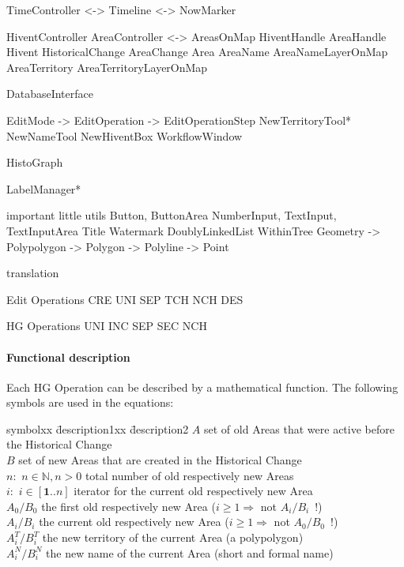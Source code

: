 TimeController  <-> Timeline
                <-> NowMarker

HiventController                AreaController <->  AreasOnMap
HiventHandle                    AreaHandle
Hivent
HistoricalChange    AreaChange  Area
                                AreaName            AreaNameLayerOnMap
                                AreaTerritory       AreaTerritoryLayerOnMap

DatabaseInterface

EditMode -> EditOperation -> EditOperationStep
NewTerritoryTool* NewNameTool NewHiventBox
WorkflowWindow

HistoGraph

LabelManager*

important little utils
  Button, ButtonArea
  NumberInput, TextInput, TextInputArea
  Title
  Watermark
  DoublyLinkedList
  WithinTree
  Geometry -> Polypolygon -> Polygon -> Polyline -> Point

translation

Edit Operations   CRE   UNI   SEP   TCH   NCH   DES

HG Operations     UNI   INC   SEP   SEC   NCH

\paragraph{Functional description} %
\label{par:functional_description}

Each HG Operation can be described by a mathematical function. The following symbols are used in the equations:

\begin{addmargin}[1em]{0em}
\begin{tabbing}
  symbolxx \= description1xx \= description2 \kill
  $A$ \> set of old Areas that were active before the Historical Change \\
  $B$ \> set of new Areas that are created in the Historical Change \\
  $n:$ \> $n \in \mathbb{N}, n>0$ \> total number of old respectively new Areas \\
  $i:$ \> $i \in [\textbf{1} .. n]$ \> iterator for the current old respectively new Area \\
  $A_0/B_0$ \>    the first old respectively new Area ($i \geq 1 \Rightarrow$ not $A_i/B_i$~!) \\
  $A_i/B_i$ \>    the current old respectively new Area ($i \geq 1 \Rightarrow$ not $A_0/B_0$~!) \\
  $A_i^T/B_i^T$ \>the new territory of the current Area (a polypolygon) \\
  $A_i^N/B_i^N$ \>the new name of the current Area (short and formal name) \\
\end{tabbing}
\end{addmargin}

